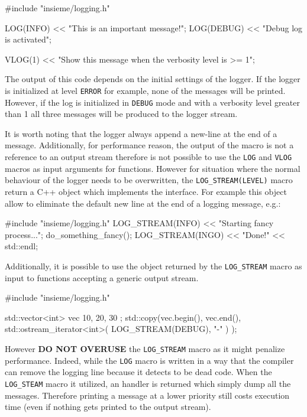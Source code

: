 \begin{srcCode}
#include "insieme/logging.h"

LOG(INFO) << "This is an important message!";
LOG(DEBUG) << "Debug log is activated";

VLOG(1) << "Show this message when the verbosity level is >= 1";
\end{srcCode}

The output of this code depends on the initial settings of the logger. If the
logger is initialized at level {\tt ERROR} for example, none of the messages
will be printed. However, if the log is initialized in {\tt DEBUG} mode and with
a verbosity level greater than 1 all three messages will be produced to the
logger stream. 

It is worth noting that the logger always append a new-line at the end of a
message. Additionally, for performance reason, the output of the macro is not a
reference to an output stream therefore is not possible to use the {\tt LOG} and
{\tt VLOG} macros as input arguments for functions. However for situation where
the normal behaviour of the logger needs to be overwritten, the 
{\tt LOG\_STREAM(LEVEL)} macro return a C++ object which implements the
 interface. For example this object allow to eliminate the
default new line at the end of a logging message, e.g.:

\begin{srcCode}
#include "insieme/logging.h"
LOG_STREAM(INFO) << "Starting fancy process...";
do_something_fancy();
LOG_STREAM(INGO) << "Done!" << std::endl;
\end{srcCode}

Additionally, it is possible to use the object returned by the {\tt LOG\_STREAM}
macro as input to functions accepting a generic output stream. 

\begin{srcCode}
#include "insieme/logging.h"

std::vector<int> vec { 10, 20, 30 };
std::copy(vec.begin(), vec.end(), 
	std::ostream_iterator<int>( LOG_STREAM(DEBUG), "-" )
);
\end{srcCode}

However {\bf DO NOT OVERUSE} the {\tt LOG\_STREAM} macro as it might penalize
performance. Indeed, while the {\tt LOG} macro is written in a way that the
compiler can remove the logging line because it detects to be dead code.  When
the {\tt LOG\_STEAM} macro it utilized, an handler is returned which simply dump
all the messages. Therefore printing a message at a lower priority still costs
execution time (even if nothing gets printed to the output stream). 

